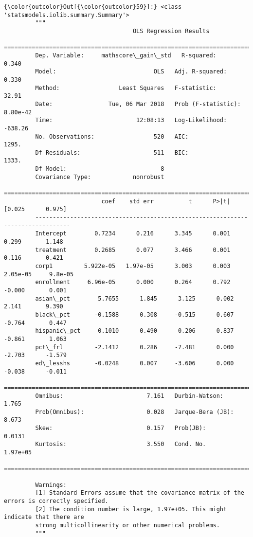 \documentclass[11pt]{article}
\begin{document}
\begin{Verbatim}[commandchars=\\\{\}]
{\color{outcolor}Out[{\color{outcolor}59}]:} <class 'statsmodels.iolib.summary.Summary'>
         """
                                     OLS Regression Results                            
         ==============================================================================
         Dep. Variable:     mathscore\_gain\_std   R-squared:                       0.340
         Model:                            OLS   Adj. R-squared:                  0.330
         Method:                 Least Squares   F-statistic:                     32.91
         Date:                Tue, 06 Mar 2018   Prob (F-statistic):           8.80e-42
         Time:                        12:08:13   Log-Likelihood:                -638.26
         No. Observations:                 520   AIC:                             1295.
         Df Residuals:                     511   BIC:                             1333.
         Df Model:                           8                                         
         Covariance Type:            nonrobust                                         
         ================================================================================
                            coef    std err          t      P>|t|      [0.025      0.975]
         --------------------------------------------------------------------------------
         Intercept        0.7234      0.216      3.345      0.001       0.299       1.148
         treatment        0.2685      0.077      3.466      0.001       0.116       0.421
         corp1         5.922e-05   1.97e-05      3.003      0.003    2.05e-05     9.8e-05
         enrollment     6.96e-05      0.000      0.264      0.792      -0.000       0.001
         asian\_pct        5.7655      1.845      3.125      0.002       2.141       9.390
         black\_pct       -0.1588      0.308     -0.515      0.607      -0.764       0.447
         hispanic\_pct     0.1010      0.490      0.206      0.837      -0.861       1.063
         pct\_frl         -2.1412      0.286     -7.481      0.000      -2.703      -1.579
         ed\_lesshs       -0.0248      0.007     -3.606      0.000      -0.038      -0.011
         ==============================================================================
         Omnibus:                        7.161   Durbin-Watson:                   1.765
         Prob(Omnibus):                  0.028   Jarque-Bera (JB):                8.673
         Skew:                           0.157   Prob(JB):                       0.0131
         Kurtosis:                       3.550   Cond. No.                     1.97e+05
         ==============================================================================
         
         Warnings:
         [1] Standard Errors assume that the covariance matrix of the errors is correctly specified.
         [2] The condition number is large, 1.97e+05. This might indicate that there are
         strong multicollinearity or other numerical problems.
         """
\end{Verbatim}
            
\end{document}
